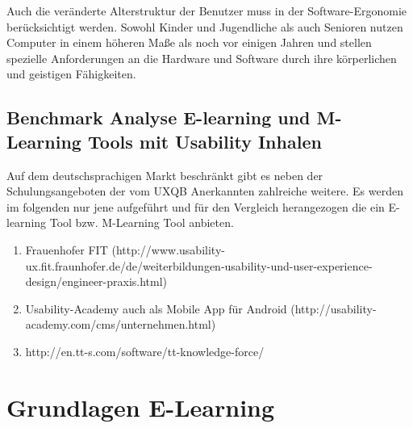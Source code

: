 \documentclass[a4paper, 12pt, twoside, BCOR=20mm, DIV=calc, abstracton, parskip=half*, toc=bibliography, toc=listof, headsepline, footsepline, headings=small, numbers=enddot]{scrreprt}
\begin{document}
		Auch die veränderte Alterstruktur der Benutzer muss in der Software-Ergonomie berücksichtigt werden. Sowohl Kinder und Jugendliche als auch Senioren nutzen Computer in einem höheren Maße als noch vor einigen Jahren und stellen spezielle Anforderungen an die Hardware und Software durch ihre körperlichen und geistigen Fähigkeiten.
		
			
	
	
	
	
	\section{Benchmark Analyse E-learning und M-Learning Tools mit Usability Inhalen}
	Auf dem deutschsprachigen Markt beschränkt gibt es neben der Schulungsangeboten der vom \ac{UXQB} Anerkannten zahlreiche weitere. Es werden im folgenden nur jene aufgeführt und für den Vergleich herangezogen die ein E-learning Tool bzw. M-Learning Tool anbieten. 
	\begin{enumerate}
		\item Frauenhofer FIT (http://www.usability-ux.fit.fraunhofer.de/de/weiterbildungen-usability-und-user-experience-design/engineer-praxis.html)
		\item Usability-Academy  auch als Mobile App für Android (http://usability-academy.com/cms/unternehmen.html)
		\item http://en.tt-s.com/software/tt-knowledge-force/
	\end{enumerate}
		
	\chapter{Grundlagen E-Learning}
\end{document}
